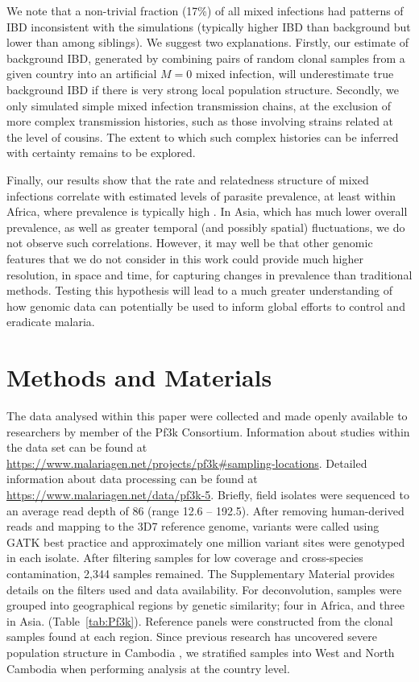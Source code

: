 \documentclass[9pt,lineno]{elife}
\begin{document}
We note that a non-trivial fraction (17\%) of all mixed infections had patterns of IBD inconsistent with the simulations (typically higher IBD than background but lower than among siblings).  We suggest two explanations.  Firstly, our estimate of background IBD, generated by combining pairs of random clonal samples from a given country into an artificial $M=0$ mixed infection, will underestimate true background IBD if there is very strong local population structure. Secondly, we only simulated simple mixed infection transmission chains, at the exclusion of more complex transmission histories, such as those involving strains related at the level of cousins. The extent to which such complex histories can be inferred with certainty remains to be explored.

Finally, our results show that the rate and relatedness structure of mixed infections correlate with estimated levels of parasite prevalence, at least within Africa, where prevalence is typically high \citep{SMITH199355}.  In Asia, which has much lower overall prevalence, as well as greater temporal (and possibly spatial) fluctuations, we do not observe such correlations. However, it may well be that other genomic features that we do not consider in this work could provide much higher resolution, in space and time, for capturing changes in prevalence than traditional methods. Testing this hypothesis will lead to a much greater understanding of how genomic data can potentially be used to inform global efforts to control and eradicate malaria.


\section{Methods and Materials}

The data analysed within this paper were collected and made openly available to researchers by member of the Pf3k Consortium.  Information about studies within the data set can be found at \url{https://www.malariagen.net/projects/pf3k#sampling-locations}.  Detailed information about data processing can be found at \url{https://www.malariagen.net/data/pf3k-5}.  Briefly, field isolates were sequenced to an average read depth of 86 (range 12.6 -- 192.5).  After removing human-derived reads and mapping to the 3D7 reference genome, variants were called using GATK best practice and approximately one million variant sites were genotyped in each isolate. After filtering samples for low coverage and cross-species contamination, 2,344 samples remained.    The Supplementary Material provides details on the filters used and data availability. For deconvolution, samples were grouped into geographical regions by genetic similarity; four in Africa, and three in Asia. (Table~\ref{tab:Pf3k}). Reference panels were constructed from the clonal samples found at each region. Since previous research has uncovered severe population structure in Cambodia \citep{Miotto2013}, we stratified samples into West and North Cambodia when performing analysis at the country level.
\end{document}
